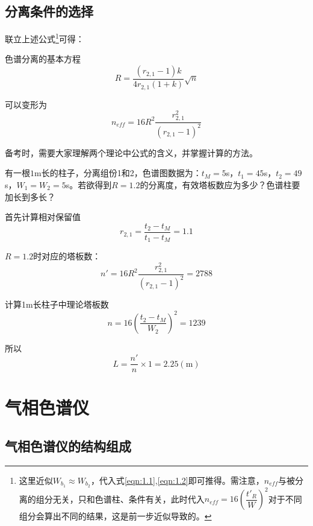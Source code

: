\subsection{分离条件的选择}
联立上述公式\footnote{这里近似$W_{b_1}\approx W_{b_2}$，代入式\eqref{eqn:1.1},\eqref{eqn:1.2}即可推得。需注意，$n_{eff}$与被分离的组分无关，只和色谱柱、条件有关，此时代入$n_{eff}=16{\left(\dfrac{t'_R}{W}\right)}^2$对于不同组分会算出不同的结果，这是前一步近似导致的。}可得：

\begin{theorem*}{色谱分离的基本方程}{}
	\begin{equation}
	R=\dfrac{(r_{2,1}-1)k}{4r_{2,1} (1+k)} \sqrt{n}
	\end{equation}
	
	可以变形为
	\begin{equation}
	n_{eff}=16R^2\dfrac{r_{2,1}^2}{(r_{2,1}-1)^2}
	\end{equation}
\end{theorem*}

备考时，需要大家理解两个理论中公式的含义，并掌握计算的方法。
\vspace{3pt}
\begin{example}
	有一根$1$m长的柱子，分离组份1和2，色谱图数据为：$t_M=5$s，$t_1=45$s，$t_2=49$s，$W_1=W_2=5$s。若欲得到$R=1.2$的分离度，有效塔板数应为多少？色谱柱要加长到多长？
	
	\solve 
	首先计算相对保留值$$r_{2,1}=\dfrac{t_2-t_M}{t_1-t_M}=1.1$$
	
	$R=1.2$时对应的塔板数：$$n'=16R^2\dfrac{r_{2,1}^2}{(r_{2,1}-1)^2}=2788$$
	
	计算1m长柱子中理论塔板数$$n=16{\left(\dfrac{t_2-t_M}{W_2}\right)}^2=1239$$
	
	所以$$L=\dfrac{n'}{n}\times 1=2.25(\mathrm{m})$$
	
\end{example}


\section{气相色谱仪}
\subsection{气相色谱仪的结构组成}

